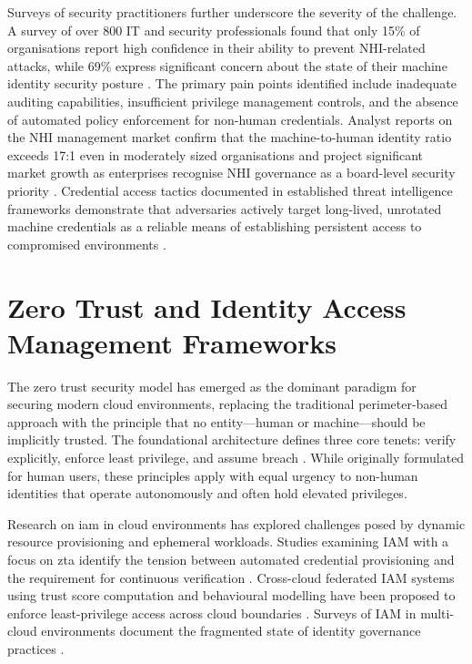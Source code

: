 Surveys of security practitioners further underscore the severity of the challenge. A survey of over 800 IT and security professionals found that only 15\% of organisations report high confidence in their ability to prevent NHI-related attacks, while 69\% express significant concern about the state of their machine identity security posture \cite{CSA2024}. The primary pain points identified include inadequate auditing capabilities, insufficient privilege management controls, and the absence of automated policy enforcement for non-human credentials. Analyst reports on the NHI management market confirm that the machine-to-human identity ratio exceeds 17:1 even in moderately sized organisations and project significant market growth as enterprises recognise NHI governance as a board-level security priority \cite{KuppingerCole2025, ResearchMarkets2024}. Credential access tactics documented in established threat intelligence frameworks demonstrate that adversaries actively target long-lived, unrotated machine credentials as a reliable means of establishing persistent access to compromised environments \cite{MITREAttack}.

\section[Zero Trust and IAM Frameworks]{\textbf{Zero Trust and Identity Access Management Frameworks}}
The zero trust security model has emerged as the dominant paradigm for securing modern cloud environments, replacing the traditional perimeter-based approach with the principle that no entity---human or machine---should be implicitly trusted. The foundational architecture defines three core tenets: verify explicitly, enforce least privilege, and assume breach \cite{NIST800207}. While originally formulated for human users, these principles apply with equal urgency to non-human identities that operate autonomously and often hold elevated privileges.

Research on \gls{iam} in cloud environments has explored challenges posed by dynamic resource provisioning and ephemeral workloads. Studies examining IAM with a focus on \gls{zta} identify the tension between automated credential provisioning and the requirement for continuous verification \cite{Mungoli2023}. Cross-cloud federated IAM systems using trust score computation and behavioural modelling have been proposed to enforce least-privilege access across cloud boundaries \cite{Potluri2024}. Surveys of IAM in multi-cloud environments document the fragmented state of identity governance practices \cite{CloudIAMSurvey2023}.

